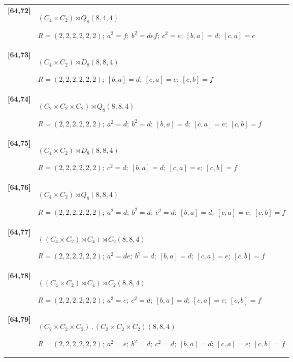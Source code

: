 \documentclass[UTF8,fontset=fandol,11pt,a4paper]{ctexart}
\begin{document}
\begin{longtable}{@{}p{17mm}>{\raggedright\arraybackslash}p{141mm}@{}}
\textbf{[64,72]} & $(C_{4}\times C_{2})\rtimes Q_{8}$\quad $(8,4,4)$\par\(R=(2,2,2,2,2,2);\allowbreak\ a^{2}=f;\allowbreak\ b^{2}=def;\allowbreak\ c^{2}=e;\allowbreak\ [b,a]=d;\allowbreak\ [c,a]=e\)\\[3pt]

\textbf{[64,73]} & $(C_{4}\times C_{2})\rtimes D_{8}$\quad $(8,8,4)$\par\(R=(2,2,2,2,2,2);\allowbreak\ [b,a]=d;\allowbreak\ [c,a]=e;\allowbreak\ [c,b]=f\)\\[3pt]

\textbf{[64,74]} & $(C_{2}\times C_{2}\times C_{2})\rtimes Q_{8}$\quad $(8,8,4)$\par\(R=(2,2,2,2,2,2);\allowbreak\ a^{2}=d;\allowbreak\ b^{2}=d;\allowbreak\ [b,a]=d;\allowbreak\ [c,a]=e;\allowbreak\ [c,b]=f\)\\[3pt]

\textbf{[64,75]} & $(C_{4}\times C_{2})\rtimes D_{8}$\quad $(8,8,4)$\par\(R=(2,2,2,2,2,2);\allowbreak\ c^{2}=d;\allowbreak\ [b,a]=d;\allowbreak\ [c,a]=e;\allowbreak\ [c,b]=f\)\\[3pt]

\textbf{[64,76]} & $(C_{4}\times C_{2})\rtimes Q_{8}$\quad $(8,8,4)$\par\(R=(2,2,2,2,2,2);\allowbreak\ a^{2}=d;\allowbreak\ b^{2}=d;\allowbreak\ c^{2}=d;\allowbreak\ [b,a]=d;\allowbreak\ [c,a]=e;\allowbreak\ [c,b]=f\)\\[3pt]

\textbf{[64,77]} & $((C_{4}\times C_{2})\rtimes C_{4})\rtimes C_{2}$\quad $(8,8,4)$\par\(R=(2,2,2,2,2,2);\allowbreak\ a^{2}=de;\allowbreak\ b^{2}=d;\allowbreak\ [b,a]=d;\allowbreak\ [c,a]=e;\allowbreak\ [c,b]=f\)\\[3pt]

\textbf{[64,78]} & $((C_{4}\times C_{2})\rtimes C_{4})\rtimes C_{2}$\quad $(8,8,4)$\par\(R=(2,2,2,2,2,2);\allowbreak\ a^{2}=e;\allowbreak\ c^{2}=d;\allowbreak\ [b,a]=d;\allowbreak\ [c,a]=e;\allowbreak\ [c,b]=f\)\\[3pt]

\textbf{[64,79]} & $(C_{2}\times C_{2}\times C_{2})\mathbin{.} (C_{2}\times C_{2}\times C_{2})$\quad $(8,8,4)$\par\(R=(2,2,2,2,2,2);\allowbreak\ a^{2}=e;\allowbreak\ b^{2}=d;\allowbreak\ c^{2}=d;\allowbreak\ [b,a]=d;\allowbreak\ [c,a]=e;\allowbreak\ [c,b]=f\)\\[3pt]


\end{longtable}
\end{document}
